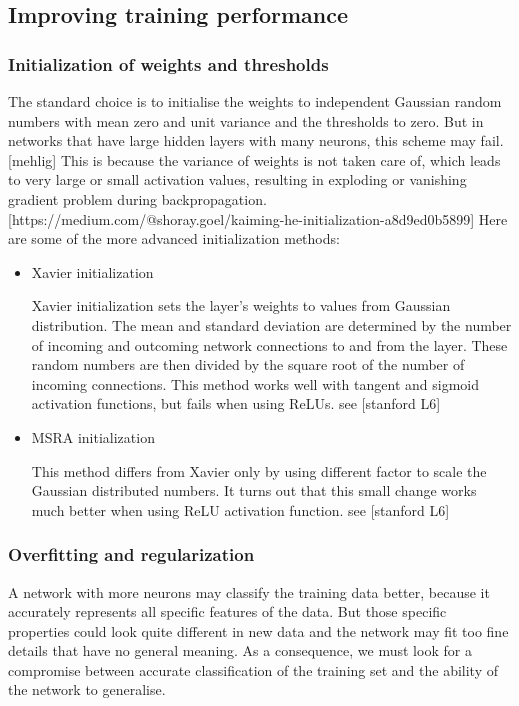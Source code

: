 \subsection{Improving training performance}
\subsubsection{Initialization of weights and thresholds}

The standard choice is to initialise the weights to independent Gaussian random numbers with mean zero and unit
variance and the thresholds to zero. But in networks that have large hidden layers with many neurons, this scheme may fail. [mehlig] This is because the variance of weights is not taken care of, which leads to very large or small activation values, resulting in exploding or vanishing gradient problem during backpropagation. [https://medium.com/@shoray.goel/kaiming-he-initialization-a8d9ed0b5899] Here are some of the more advanced initialization methods:

\begin{itemize}
	\item Xavier initialization
		
	Xavier initialization sets the layer’s weights to values from Gaussian distribution. The mean and standard deviation are determined by the number of incoming and outcoming network connections to and from the layer. These random numbers are then divided by the square root of the number of incoming connections. This method works well with tangent and sigmoid activation functions, but fails when using ReLUs. see [stanford L6]	
	
	\item MSRA initialization

	This method differs from Xavier only by using different factor to scale the Gaussian distributed numbers. It turns out that this small change works much better when using ReLU activation function. see [stanford L6]
	
\end{itemize}

\subsubsection{Overfitting and regularization}
A network with more neurons may classify the training data better, because it accurately represents all specific features of the data. But those specific properties could look quite different in new data and the network may fit too fine details that have no general meaning. As a consequence, we must look for a compromise between accurate classification of the training set and the ability of the network to generalise. 

